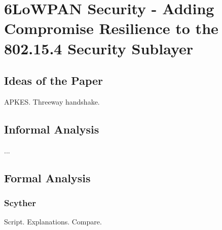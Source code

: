 \chapter{6LoWPAN Security - Adding Compromise Resilience to the 802.15.4 Security Sublayer}
\label{chp:krentz-6lowpan}


\section{Ideas of the Paper}

APKES. Threeway handshake.

\section{Informal Analysis}

...

\section{Formal Analysis}

\subsection{Scyther}


Script. Explanations. Compare.










